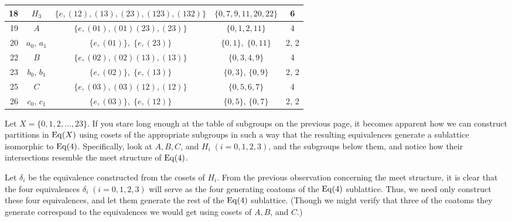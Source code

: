 {\begin{center}
\begin{tabular}{|r|c|c|c|c|}
\hline
18&$H_3$ & $\{e, (12), (13), (23), (123), (132)\}$ & $\{0, 7, 9, 11, 20, 22\}$& 6\\[4pt]
\hline
19&$A$ & $\{e, (01),(01)(23),(23) \}$ & $\{0, 1, 2, 11\}$& 4 \\[4pt]
\hline
20&$a_0,\, a_1$ & $\{e, (01)\}, \; \{e, (23) \}$ & $\{0, 1\}, \;\{0, 11\}$& 2, 2 \\[4pt]
\hline
22&$B$ & $\{e, (02), (02)(13),(13)\}$ & $\{0, 3, 4, 9\}$& 4 \\[4pt]
\hline
23&$b_0,\, b_1$ & $\{e, (02)\}, \; \{e, (13)\}$ & $\{0, 3\}, \, \{0, 9\}$& 2, 2 \\[4pt]
\hline
25&$C$ & $\{e, (03), (03)(12), (12)\}$ & $\{0, 5, 6, 7\}$& 4 \\[4pt]
\hline
26&$c_0, \, c_1$ & $\{e, (03)\}, \; \{e, (12)\}$ & $\{0, 5\}, \, \{0, 7\}$& 2, 2 \\[4pt]
\hline
\end{tabular}
\end{center}
}
\newpage
Let $X = \{0, 1, 2, \ldots, 23\}$.  
If you stare long enough at the table of subgroups on the previous page, it becomes apparent
how we can construct partitions in $\operatorname{Eq}(X)$ using cosets of the appropriate subgroups
in such a way that the resulting equivalences generate a sublattice isomorphic to
$\operatorname{Eq}(4)$. Specifically, look at $A, B, C$, and $H_i \; (i=0,1,2,3)$, and the
subgroups below them, and notice how their intersections resemble the meet 
structure of $\operatorname{Eq}(4)$.  

Let $\delta_i$ be the equivalence constructed from the cosets of $H_i$.  From the
previous observation concerning the meet structure, it is clear that the
four equivalences $\delta_i \; (i=0,1,2,3)$ will serve as the four generating
coatoms of the $\operatorname{Eq}(4)$ sublattice.  Thus, we need only construct these four
equivalences, and let them generate the rest of the $\operatorname{Eq}(4)$ sublattice.
(Though we might verify that three of the coatoms they generate correspond to
the equivalences we would get using cosets of $A, B$, and $C$.)

